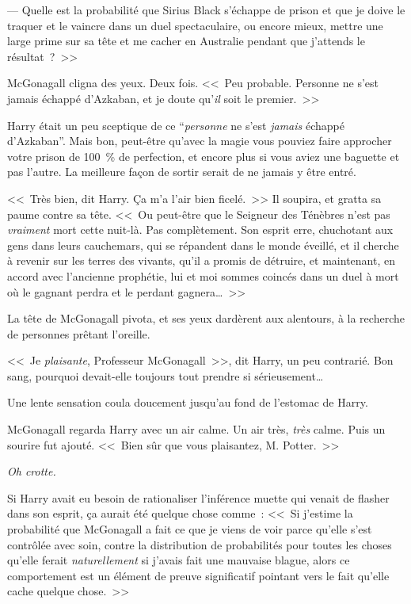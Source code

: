 --- Quelle est la probabilité que Sirius Black s'échappe de prison et que je doive le traquer et le vaincre dans un duel spectaculaire, ou encore mieux, mettre une large prime sur sa tête et me cacher en Australie pendant que j'attends le résultat~?~>>

McGonagall cligna des yeux. Deux fois. <<~Peu probable. Personne ne s'est jamais échappé d'Azkaban, et je doute qu'\emph{il} soit le premier.~>>

Harry était un peu sceptique de ce “\emph{personne} ne s'est \emph{jamais} échappé d'Azkaban”. Mais bon, peut-être qu'avec la magie vous pouviez faire approcher votre prison de 100~\% de perfection, et encore plus si vous aviez une baguette et pas l'autre. La meilleure façon de sortir serait de ne jamais y être entré.

<<~Très bien, dit Harry. Ça m'a l'air bien ficelé.~>> Il soupira, et gratta sa paume contre sa tête. <<~Ou peut-être que le Seigneur des Ténèbres n'est pas \emph{vraiment} mort cette nuit-là. Pas complètement. Son esprit erre, chuchotant aux gens dans leurs cauchemars, qui se répandent dans le monde éveillé, et il cherche à revenir sur les terres des vivants, qu'il a promis de détruire, et maintenant, en accord avec l'ancienne prophétie, lui et moi sommes coincés dans un duel à mort où le gagnant perdra et le perdant gagnera…~>>

La tête de McGonagall pivota, et ses yeux dardèrent aux alentours, à la recherche de personnes prêtant l'oreille.

<<~Je \emph{plaisante}, Professeur McGonagall~>>, dit Harry, un peu contrarié. Bon sang, pourquoi devait-elle toujours tout prendre si sérieusement…

Une lente sensation coula doucement jusqu'au fond de l'estomac de Harry.

McGonagall regarda Harry avec un air calme. Un air très, \emph{très} calme. Puis un sourire fut ajouté. <<~Bien sûr que vous plaisantez, M. Potter.~>>

\emph{Oh crotte.}

Si Harry avait eu besoin de rationaliser l'inférence muette qui venait de flasher dans son esprit, ça aurait été quelque chose comme~: <<~Si j'estime la probabilité que McGonagall a fait ce que je viens de voir parce qu'elle s'est contrôlée avec soin, contre la distribution de probabilités pour toutes les choses qu'elle ferait \emph{naturellement} si j'avais fait une mauvaise blague, alors ce comportement est un élément de preuve significatif pointant vers le fait qu'elle cache quelque chose.~>>

